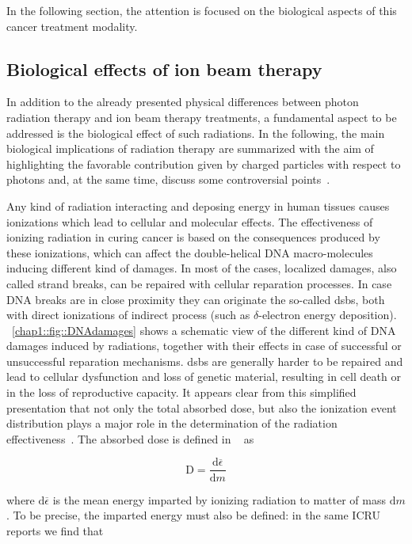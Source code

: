 In the following section, the attention is focused on the biological aspects of this cancer treatment modality.


\subsection{Biological effects of ion beam therapy}\label{chap1::subsec::bioEffects} 
In addition to the already presented physical differences between photon radiation therapy and ion beam therapy treatments, a fundamental aspect to be addressed is the biological effect of such radiations. In the following, the main biological implications of radiation therapy are summarized with the aim of highlighting the favorable contribution given by charged particles with respect to photons and, at the same time, discuss some controversial points~\parencite{Paganetti2013}.

Any kind of radiation interacting and deposing energy in human tissues causes ionizations which lead to cellular and molecular effects. The effectiveness of ionizing radiation in curing cancer is based on the consequences produced by these ionizations, which can affect the double-helical DNA macro-molecules inducing different kind of damages. In most of the cases, localized damages, also called strand breaks, can be repaired with cellular reparation processes. In case DNA breaks are in close proximity they can originate the so-called \glspl{dsb}, both with direct ionizations of indirect process (such as $\delta$-electron energy deposition). \figurename~\ref{chap1::fig::DNAdamages} shows a schematic view of the different kind of DNA damages induced by radiations, together with their effects in case of  successful or unsuccessful reparation mechanisms. \glspl{dsb} are generally harder to be repaired and lead to cellular dysfunction and loss of genetic material, resulting in cell death or in the loss of reproductive capacity. It appears clear from this simplified presentation that not only the total absorbed dose, but also the ionization event distribution plays a major role in the determination of the radiation effectiveness~\parencite{Belli1992}.        
The absorbed dose is defined in ~\cite{ICRU1980, ICRU1998} as 

\begin{equation}
\mathrm{D} = \frac{\mathrm{d}\overline{\epsilon}}{\mathrm{d}m}
\label{chap1::eq::AbsDoseDef}
\end{equation}

where $\mathrm{d}\overline{\epsilon}$ is the mean energy imparted by ionizing radiation to matter of mass $\mathrm{d}m$. To be precise, the imparted energy must also be defined: in the same ICRU reports we find that 

